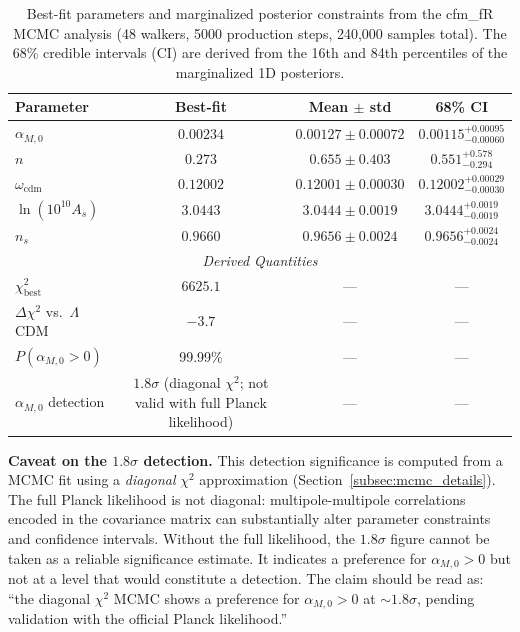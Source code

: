 \documentclass[aps,prd,twocolumn,superscriptaddress,nofootinbib]{revtex4-2}
\begin{document}
\begin{table}
\centering
\caption{Best-fit parameters and marginalized posterior constraints from the cfm\_fR MCMC analysis (48 walkers, 5000 production steps, 240{,}000 samples total). The 68\% credible intervals (CI) are derived from the 16th and 84th percentiles of the marginalized 1D posteriors.}
\label{tab:bestfit}
\begin{tabular}{lccc}
\toprule
\textbf{Parameter} & \textbf{Best-fit} & \textbf{Mean $\pm$ std} & \textbf{68\% CI} \\
\midrule
$\alpha_{M,0}$ & $0.00234$ & $0.00127 \pm 0.00072$ & $0.00115^{+0.00095}_{-0.00060}$ \\
$n$ & $0.273$ & $0.655 \pm 0.403$ & $0.551^{+0.578}_{-0.294}$ \\
$\omega_{\mathrm{cdm}}$ & $0.12002$ & $0.12001 \pm 0.00030$ & $0.12002^{+0.00029}_{-0.00030}$ \\
$\ln(10^{10}A_s)$ & $3.0443$ & $3.0444 \pm 0.0019$ & $3.0444^{+0.0019}_{-0.0019}$ \\
$n_s$ & $0.9660$ & $0.9656 \pm 0.0024$ & $0.9656^{+0.0024}_{-0.0024}$ \\
\midrule
\multicolumn{4}{c}{\textit{Derived Quantities}} \\
$\chi^2_{\mathrm{best}}$ & $6625.1$ & --- & --- \\
$\Delta\chi^2$ vs.\ $\Lambda$CDM & $-3.7$ & --- & --- \\
$P(\alpha_{M,0} > 0)$ & 99.99\% & --- & --- \\
$\alpha_{M,0}$ detection & $1.8\sigma$ (diagonal $\chi^2$; not valid with full Planck likelihood) & --- & --- \\
\bottomrule
\end{tabular}
\end{table}

\textbf{Caveat on the $1.8\sigma$ detection.} This detection significance is computed from a MCMC fit using a \textit{diagonal} $\chi^2$ approximation (Section~\ref{subsec:mcmc_details}). The full Planck likelihood is not diagonal: multipole-multipole correlations encoded in the covariance matrix can substantially alter parameter constraints and confidence intervals. Without the full likelihood, the $1.8\sigma$ figure cannot be taken as a reliable significance estimate. It indicates a preference for $\alpha_{M,0} > 0$ but not at a level that would constitute a detection. The claim should be read as: ``the diagonal $\chi^2$ MCMC shows a preference for $\alpha_{M,0} > 0$ at $\sim 1.8\sigma$, pending validation with the official Planck likelihood.''
\end{document}
